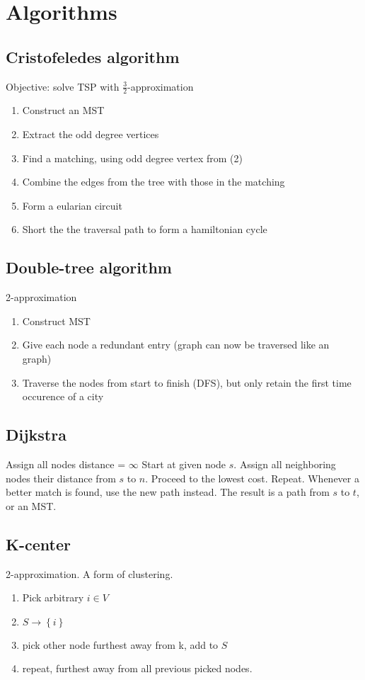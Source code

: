 \section{Algorithms}

\subsection{Cristofeledes algorithm}
Objective: solve TSP with $\frac{3}{2}$-approximation
\begin{enumerate}
    \item Construct an MST
    \item Extract the odd degree vertices
    \item Find a matching, using odd degree vertex from (2)
    \item Combine the edges from the tree with those in the matching
    \item Form a eularian circuit
    \item Short the the traversal path to form a hamiltonian cycle
\end{enumerate}

\subsection{Double-tree algorithm}
2-approximation
\begin{enumerate}
    \item Construct MST
    \item Give each node a redundant entry (graph can now be traversed like
            an~ graph)
    \item Traverse the nodes from start to finish (DFS), but only retain the first
        time occurence of a city
\end{enumerate}

\subsection{Dijkstra}
Assign all nodes distance = $\infty$
Start at given node $s$. Assign all neighboring nodes their distance from $s$
to $n$. Proceed to the lowest cost. Repeat. Whenever a better match is found,
use the new path instead. The result is a path from $s$ to $t$, or an MST.\

\subsection{K-center}
2-approximation. A form of clustering.
\begin{enumerate}
    \item Pick arbitrary $i \in V$
    \item $S \rightarrow \left\{i\right\}$
    \item pick other node furthest away from k, add to $S$
    \item repeat, furthest away from all previous picked nodes.
\end{enumerate}

